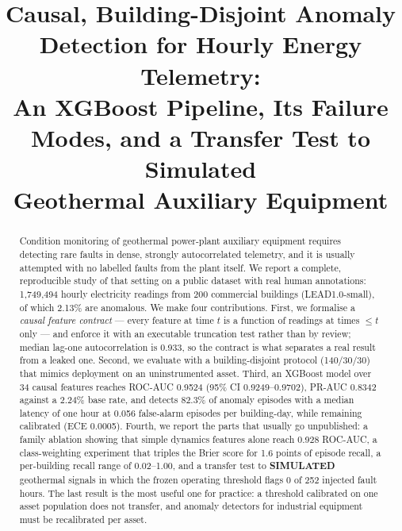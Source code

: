 \documentclass[conference]{IEEEtran}
\newcommand{\simnote}{\textbf{SIMULATED}}
\begin{document}
\title{Causal, Building-Disjoint Anomaly Detection for Hourly Energy Telemetry:\\
An XGBoost Pipeline, Its Failure Modes, and a Transfer Test to Simulated\\
Geothermal Auxiliary Equipment}

\author{
}

\maketitle

\begin{abstract}
Condition monitoring of geothermal power-plant auxiliary equipment requires detecting rare faults in
dense, strongly autocorrelated telemetry, and it is usually attempted with no labelled faults from the
plant itself. We report a complete, reproducible study of that setting on a public dataset with real
human annotations: 1{,}749{,}494 hourly electricity readings from 200 commercial buildings
(LEAD1.0-small), of which 2.13\% are anomalous. We make four contributions. First, we formalise a
\emph{causal feature contract} --- every feature at time $t$ is a function of readings at times
$\le t$ only --- and enforce it with an executable truncation test rather than by review; median
lag-one autocorrelation is 0.933, so the contract is what separates a real result from a leaked one.
Second, we evaluate with a building-disjoint protocol (140/30/30) that mimics deployment on an
uninstrumented asset. Third, an XGBoost model over 34 causal features reaches ROC-AUC
0.9524 (95\% CI 0.9249--0.9702), PR-AUC 0.8342 against a 2.24\% base rate, and detects 82.3\% of
anomaly episodes with a median latency of one hour at 0.056 false-alarm episodes per building-day,
while remaining calibrated (ECE 0.0005). Fourth, we report the parts that usually go unpublished: a
family ablation showing that simple dynamics features alone reach 0.928 ROC-AUC, a class-weighting
experiment that triples the Brier score for 1.6 points of episode recall, a per-building recall range
of 0.02--1.00, and a transfer test to \simnote{} geothermal signals in which the frozen operating
threshold flags 0 of 252 injected fault hours. The last result is the most useful one for practice:
a threshold calibrated on one asset population does not transfer, and anomaly detectors for
industrial equipment must be recalibrated per asset.
\end{abstract}
\end{document}
